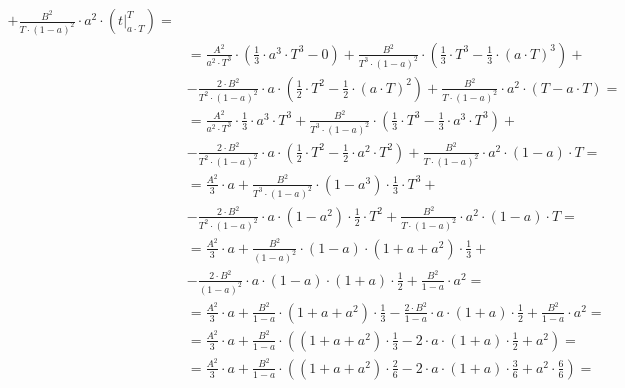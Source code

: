 \begin{task}
\begin{align*}
 + \frac{B^2}{T \cdot \left(1 - a \right)^2} \cdot a^2 \cdot \left( \left. t \right|_{a \cdot T}^{T} \right)=\\
 &=\frac{A^2}{a^2 \cdot T^3}\cdot \left(\frac{1}{3}\cdot a^3 \cdot T^3 - 0 \right)
 +\frac{B^2}{T^3 \cdot \left(1 - a \right)^2}\cdot \left( \frac{1}{3} \cdot T^3 -\frac{1}{3} \cdot \left( a\cdot T \right)^3 \right) +\\
 &- \frac{2\cdot B^2}{T^2\cdot \left(1 - a\right)^2}\cdot a \cdot \left( \frac{1}{2} \cdot T^2 -  \frac{1}{2} \cdot \left(a \cdot T\right)^2 \right)
 + \frac{B^2}{T \cdot \left(1 - a \right)^2} \cdot a^2 \cdot \left( T - a \cdot T \right)=\\
 &=\frac{A^2}{a^2 \cdot T^3}\cdot \frac{1}{3}\cdot a^3 \cdot T^3
 +\frac{B^2}{T^3 \cdot \left(1 - a \right)^2}\cdot \left( \frac{1}{3} \cdot T^3 -\frac{1}{3} \cdot a^3 \cdot T ^3 \right) +\\
 &- \frac{2\cdot B^2}{T^2 \cdot \left(1 - a\right)^2}\cdot a \cdot \left( \frac{1}{2} \cdot T^2 -  \frac{1}{2} \cdot a^2 \cdot T^2 \right)
 + \frac{B^2}{T \cdot \left(1 - a \right)^2} \cdot a^2 \cdot \left( 1 - a\right) \cdot T=\\
 &=\frac{A^2}{3}\cdot a
 +\frac{B^2}{T^3 \cdot \left(1 - a \right)^2}\cdot \left(1 -a^3 \right)\cdot \frac{1}{3} \cdot T^3 +\\
 &- \frac{2\cdot B^2}{T^2\cdot \left(1 - a\right)^2}\cdot a \cdot \left( 1 -   a^2 \right) \cdot \frac{1}{2} \cdot T^2
 + \frac{B^2}{T \cdot \left(1 - a \right)^2} \cdot a^2 \cdot \left( 1 - a\right) \cdot T=\\ 
 &=\frac{A^2}{3}\cdot a
 +\frac{B^2}{\left(1 - a\right)^2}\cdot \left(1-a\right)\cdot \left(1 +a + a^2 \right)\cdot \frac{1}{3}+\\
 &- \frac{2\cdot B^2}{\left(1 - a\right)^2}\cdot a \cdot \left( 1 - a \right) \cdot \left( 1 + a \right) \cdot \frac{1}{2}
 + \frac{B^2}{1 - a} \cdot a^2=\\
 &=\frac{A^2}{3}\cdot a
 +\frac{B^2}{1 - a}\cdot \left(1 +a + a^2 \right)\cdot \frac{1}{3}
 - \frac{2\cdot B^2}{1 - a}\cdot a \cdot \left( 1 + a \right) \cdot \frac{1}{2}
 + \frac{B^2}{1 - a} \cdot a^2=\\
 &=\frac{A^2}{3}\cdot a
 +\frac{B^2}{1 - a} \cdot \left( \left(1 +a + a^2 \right)\cdot \frac{1}{3}
 - 2 \cdot a \cdot \left( 1 + a \right) \cdot \frac{1}{2}
 + a^2 \right)=\\
 &=\frac{A^2}{3}\cdot a
 +\frac{B^2}{1 - a} \cdot \left( \left(1 +a + a^2 \right)\cdot \frac{2}{6} - 2 \cdot a \cdot \left( 1 + a \right) \cdot \frac{3}{6}
 + a^2 \cdot \frac{6}{6} \right)=\\ 

\end{align*}
\end{task}
